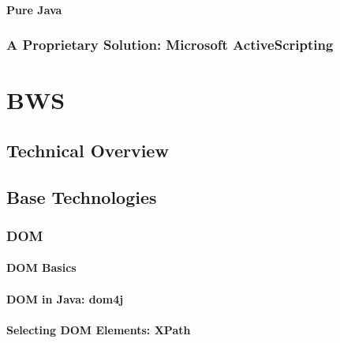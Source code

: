    \subsubsection{Pure Java}
   
    
    
  \subsection{A Proprietary Solution: Microsoft ActiveScripting}
  \label{sec:activescripting}
    
   
     
\chapter{BWS}

 

 \section{Technical Overview}
  
  
  
 \section{Base Technologies}
 \label{sec:BaseTechnologies}
  
  
  
  \subsection{DOM}
  
   
   
   \subsubsection{DOM Basics}
   
    
    
   \subsubsection{DOM in Java: dom4j}
    
    
    
   \subsubsection{Selecting DOM Elements: XPath}
   \label{sec:SelectingDOMElementsXPath}
    
   
